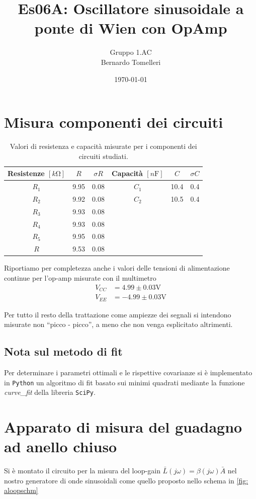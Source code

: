 \documentclass[10pt, a4paper, italian]{article}
\author{Gruppo 1.AC \\ Bernardo Tomelleri}
\title{Es06A: Oscillatore sinusoidale a ponte di Wien con OpAmp}
\begin{document}
\date{\today}
\maketitle

\setcounter{section}{0}

\section*{Misura componenti dei circuiti}
\begin{table}[htbp]
\centering
\begin{tabular}{cccccc}
\toprule
Resistenze $[\si{k\ohm}]$ & $R$ & $\sigma R$ & Capacità $[\si{n\F}]$ & $C$ &
$\sigma C$ \\
\midrule
\midrule
$R_1$	  & 9.95	& 0.08	 & $C_1$ & 10.4		 & 0.4 \\
$R_2$	  & 9.92	& 0.08 	 & $C_2$ & 10.5		 & 0.4 \\
$R_3$	  & 9.93	& 0.08	 & & & \\
$R_4$	  & 9.93	& 0.08	 & & & \\
$R_5$	  & 9.95	& 0.08	 & & & \\
$R$		  & 9.53	& 0.08	 & & & \\
\bottomrule     
\end{tabular}
\caption{Valori di resistenza e capacità misurate per i componenti dei
circuiti studiati. \label{tab: rcmes}}
\end{table}

Riportiamo per completezza anche i valori delle tensioni di alimentazione
continue per l'op-amp misurate con il multimetro
\begin{align*}
V_{CC} &= 4.99 \pm 0.03 \si{\V} \\
V_{EE} &= -4.99 \pm 0.03 \si{\V}
\end{align*}

Per tutto il resto della trattazione come ampiezze dei segnali si intendono
misurate non ``picco - picco'', a meno che non venga esplicitato altrimenti.

\subsection*{Nota sul metodo di fit}
Per determinare i parametri ottimali e le rispettive covarianze si \`e
implementato in \verb+Python+ un algoritmo di fit basato sui minimi quadrati
mediante la funzione \emph{curve\_fit} della libreria \texttt{SciPy}.

\section{Apparato di misura del guadagno ad anello chiuso}
Si è montato il circuito per la misura del loop-gain
$\bar{L}(j\omega) = \beta(j\omega) \bar{A}$ nel nostro generatore di
onde sinusoidali come quello proposto nello schema in \cref{fig: aloopschm}
\end{document}
